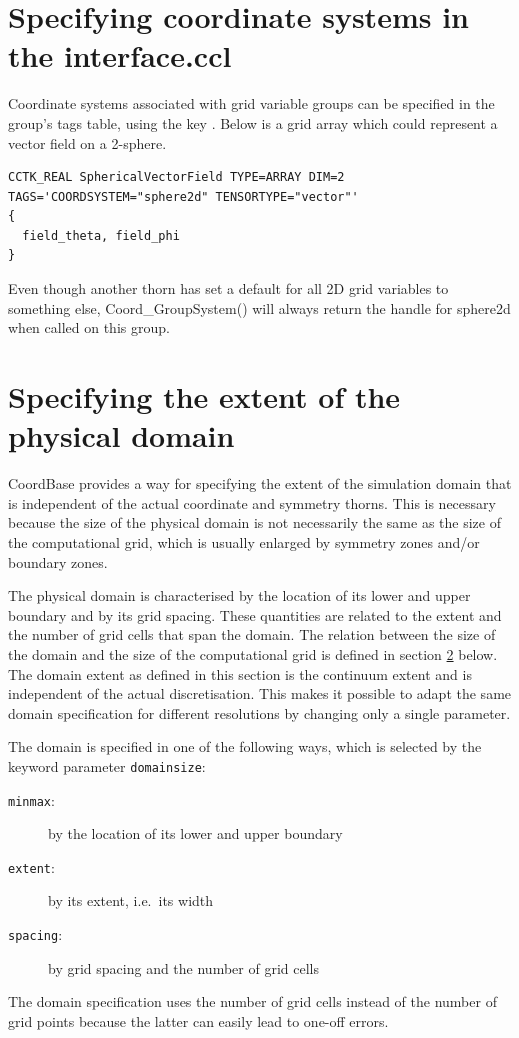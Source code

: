 

\section{Specifying coordinate systems in the interface.ccl}

Coordinate systems associated with grid variable groups can be
specified in the group's tags table, using the key .
Below is a grid array which could represent a vector field on a
2-sphere.
\begin{verbatim}
CCTK_REAL SphericalVectorField TYPE=ARRAY DIM=2 TAGS='COORDSYSTEM="sphere2d" TENSORTYPE="vector"'
{
  field_theta, field_phi
}
\end{verbatim}
Even though another thorn has set a default for all 2D grid variables
to something else, Coord\_GroupSystem() will always return the handle
for sphere2d when called on this group.


\section{Specifying the extent of the physical domain}
\label{CactusBase:CoordBase:domain}

CoordBase provides a way for specifying the extent of the simulation
domain that is independent of the actual coordinate and symmetry
thorns.  This is necessary because the size of the physical domain is
not necessarily the same as the size of the computational grid, which
is usually enlarged by symmetry zones and/or boundary zones.

The physical domain is characterised by the location of its lower and
upper boundary and by its grid spacing.  These quantities are related
to the extent and the number of grid cells that span the domain.  The
relation between the size of the domain and the size of the
computational grid is defined in section
{\ref{CactusBase:CoordBase:domain}} below.  The domain extent as
defined in this section is the continuum extent and is independent of
the actual discretisation.  This makes it possible to adapt the same
domain specification for different resolutions by changing only a
single parameter.

The domain is specified in one of the following ways, which is
selected by the keyword parameter {\texttt{domainsize}}:
\begin{description}
\item[{\texttt{minmax}}:]
by the location of its lower and upper boundary
\item[{\texttt{extent}}:]
by its extent, i.e.\ its width
\item[{\texttt{spacing}}:]
by grid spacing and the number of grid cells
\end{description}
The domain specification uses the number of grid cells instead of the
number of grid points because the latter can easily lead to one-off
errors.

